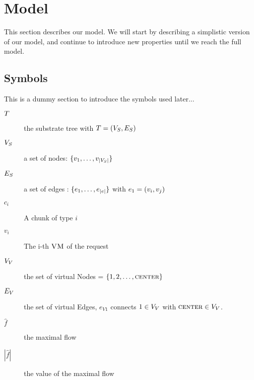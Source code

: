 \section{Model}

This section describes our model. We will start by describing a simplistic 
version of our model, and continue to introduce new properties until we reach 
the full model.

\subsection{Symbols}

This is a dummy section to introduce the symbols used later...

\begin{description}
 \item [$T$] the substrate tree with $T = (V_S , E_S)$
 \item [$V_S$]  a set of nodes: $\{v_1, \dots , 
v_{|V_S|}\}$
 \item [$E_S$] a set of edges : $\{e_1, \dots , 
 e_{|e|}\}$ with $e_1 = 
(v_i, v_j)$
 \item [$c_i$] A chunk of type $i$
 \item [$v_i$] The i-th $\textsc{VM}$ of the request
 \item [$V_V$] the set of virtual Nodes = $\{1,2,\dots,\textsc{center}\}$
 \item [$E_V$] the set of virtual Edges, $e_{V1}$ connects $1 \in 
V_V$ with $\textsc{center} \in V_V$.
 \item [$\hat f$] the maximal flow
 \item [$|\hat f|$] the value of the maximal flow


\end{description}
